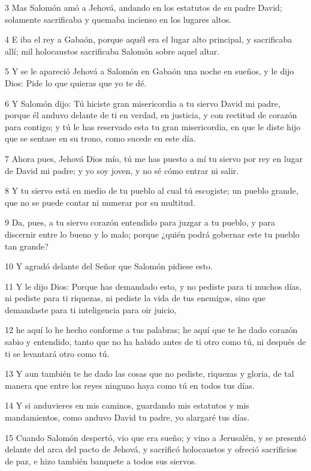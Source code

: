 \par 3 Mas Salomón amó a Jehová, andando en los estatutos de su padre David; solamente sacrificaba y quemaba incienso en los lugares altos.
\par 4 E iba el rey a Gabaón, porque aquél era el lugar alto principal, y sacrificaba allí; mil holocaustos sacrificaba Salomón sobre aquel altar.
\par 5 Y se le apareció Jehová a Salomón en Gabaón una noche en sueños, y le dijo Dios: Pide lo que quieras que yo te dé.
\par 6 Y Salomón dijo: Tú hiciste gran misericordia a tu siervo David mi padre, porque él anduvo delante de ti en verdad, en justicia, y con rectitud de corazón para contigo; y tú le has reservado esta tu gran misericordia, en que le diste hijo que se sentase en su trono, como sucede en este día.
\par 7 Ahora pues, Jehová Dios mío, tú me has puesto a mí tu siervo por rey en lugar de David mi padre; y yo soy joven, y no sé cómo entrar ni salir.
\par 8 Y tu siervo está en medio de tu pueblo al cual tú escogiste; un pueblo grande, que no se puede contar ni numerar por su multitud.
\par 9 Da, pues, a tu siervo corazón entendido para juzgar a tu pueblo, y para discernir entre lo bueno y lo malo; porque ¿quién podrá gobernar este tu pueblo tan grande?
\par 10 Y agradó delante del Señor que Salomón pidiese esto.
\par 11 Y le dijo Dios: Porque has demandado esto, y no pediste para ti muchos días, ni pediste para ti riquezas, ni pediste la vida de tus enemigos, sino que demandaste para ti inteligencia para oir juicio,
\par 12 he aquí lo he hecho conforme a tus palabras; he aquí que te he dado corazón sabio y entendido, tanto que no ha habido antes de ti otro como tú, ni después de ti se levantará otro como tú.
\par 13 Y aun también te he dado las cosas que no pediste, riquezas y gloria, de tal manera que entre los reyes ninguno haya como tú en todos tus días.
\par 14 Y si anduvieres en mis caminos, guardando mis estatutos y mis mandamientos, como anduvo David tu padre, yo alargaré tus días.
\par 15 Cuando Salomón despertó, vio que era sueño; y vino a Jerusalén, y se presentó delante del arca del pacto de Jehová, y sacrificó holocaustos y ofreció sacrificios de paz, e hizo también banquete a todos sus siervos.

